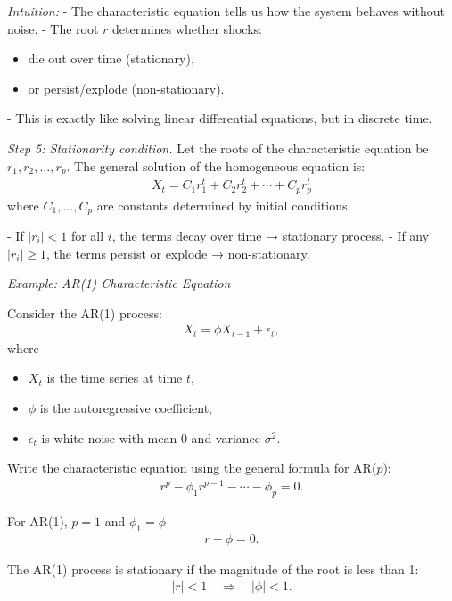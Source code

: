 \documentclass[10pt,a4paper]{article}
\begin{document}
	\textit{Intuition:}  
	- The characteristic equation tells us how the system behaves without noise.  
	- The root $r$ determines whether shocks:
	\begin{itemize}
	    \item die out over time (stationary),
	    \item or persist/explode (non-stationary).
	\end{itemize}
	- This is exactly like solving linear differential equations, but in discrete time.
	
	
	\textit{Step 5: Stationarity condition.}  
	Let the roots of the characteristic equation be $r_1, r_2, \dots, r_p$.  
	The general solution of the homogeneous equation is:
	\begin{align*}
	X_t = C_1 r_1^t + C_2 r_2^t + \cdots + C_p r_p^t
	\end{align*}
	where $C_1,\dots,C_p$ are constants determined by initial conditions.
	
	- If $|r_i| < 1$ for all $i$, the terms decay over time → stationary process.
	- If any $|r_i| \ge 1$, the terms persist or explode → non-stationary.
	
	\textit{Example: AR(1) Characteristic Equation}
	
	Consider the AR(1) process:
	\begin{align*}
	X_t = \phi X_{t-1} + \epsilon_t,
	\end{align*}
	where
	\begin{itemize}
	    \item $X_t$ is the time series at time $t$,
	    \item $\phi$ is the autoregressive coefficient,
	    \item $\epsilon_t$ is white noise with mean $0$ and variance $\sigma^2$.
	\end{itemize}
	
	Write the characteristic equation using the general formula for AR($p$):
	\begin{align*}
	r^p - \phi_1 r^{p-1} - \cdots - \phi_p = 0.
	\end{align*}
	
	For AR(1), $p=1$ and $\phi_1 = \phi$
	\begin{align*}
	r - \phi = 0.
	\end{align*}
	
	
	The AR(1) process is stationary if the magnitude of the root is less than 1:
	\begin{align*}
	|r| < 1 \quad \Rightarrow \quad |\phi| < 1.
	\end{align*}
	
\end{document}
